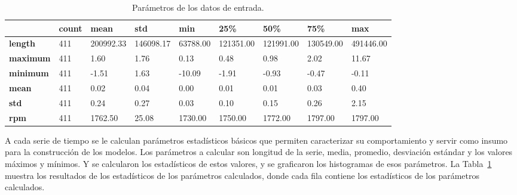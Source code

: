 \documentclass[11pt,a4paper,spanish]{book}
\numberwithin{equation}{chapter}
\numberwithin{figure}{chapter}
\begin{document}
\begin{table}[h]
\centering
\renewcommand{\arraystretch}{1.2}
\footnotesize
\begin{tabularx}{\textwidth}{|l|X|X|X|X|X|X|X|X|}
    \hline
    \textbf{ } & \textbf{count} & \textbf{mean} & \textbf{std} & \textbf{min} & \textbf{25\%} & \textbf{50\%} & \textbf{75\%} & \textbf{max} \\
    \hline
    \textbf{length} & 411 & 200992.33 & 146098.17 & 63788.00 & 121351.00 & 121991.00 & 130549.00 & 491446.00 \\
    \hline
    \textbf{maximum} & 411 & 1.60 & 1.76 & 0.13 & 0.48 & 0.98 & 2.02 & 11.67 \\
    \hline
    \textbf{minimum} & 411 & -1.51 & 1.63 & -10.09 & -1.91 & -0.93 & -0.47 & -0.11 \\
    \hline
    \textbf{mean} & 411 & 0.02 & 0.04 & 0.00 & 0.01 & 0.01 & 0.03 & 0.40 \\
    \hline
    \textbf{std} & 411 & 0.24 & 0.27 & 0.03 & 0.10 & 0.15 & 0.26 & 2.15 \\
    \hline
    \textbf{rpm} & 411 & 1762.50 & 25.08 & 1730.00 & 1750.00 & 1772.00 & 1797.00 & 1797.00 \\
    \hline
\end{tabularx}
\caption{Parámetros de los datos de entrada.}
\label{tab:stats}
\end{table}



A cada serie de tiempo se le calculan parámetros estadísticos básicos que permiten 
caracterizar su comportamiento y servir como insumo para la construcción de los modelos. 
Los parámetros a calcular son longitud de la serie, media, promedio, desviación estándar 
y los valores máximos y mínimos. Y se calcularon los estadísticos de estos valores, y se 
graficaron los histogramas de esos parámetros. La Tabla~\ref{tab:stats} muestra los 
resultados de los estadísticos de los parámetros calculados, donde cada fila contiene 
los estadísticos de los parámetros calculados. 
\end{document}
